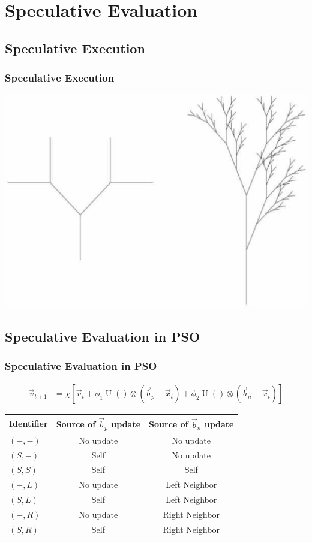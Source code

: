 \documentclass{beamer}
\DeclareMathOperator{\URand}{U}
\providecommand{\ppos}{\ensuremath{\Vec{x}}}
\providecommand{\pvel}{\ensuremath{\Vec{v}}}
\providecommand{\nbest}{\ensuremath{\Vec{b}_n}}
\providecommand{\pbest}{\ensuremath{\Vec{b}_p}}
\providecommand{\constriction}{\ensuremath{\chi}}
\providecommand{\coeff}{\ensuremath{\phi}}
\providecommand{\leftind}{\ensuremath{L}}
\providecommand{\rightind}{\ensuremath{R}}
\providecommand{\casexn}{\ensuremath{(S,-)}}
\providecommand{\casexx}{\ensuremath{(S,S)}}
\providecommand{\casexl}{\ensuremath{(S,\leftind)}}
\providecommand{\casexr}{\ensuremath{(S,\rightind)}}
\providecommand{\casepn}{\ensuremath{(-,-)}}
\providecommand{\casepl}{\ensuremath{(-,\leftind)}}
\providecommand{\casepr}{\ensuremath{(-,\rightind)}}
\begin{document}
\section{Speculative Evaluation}

\subsection{Speculative Execution}
\begin{frame}
  \frametitle{Speculative Execution}
  \includegraphics[width=\textwidth]{branching}
\end{frame}

\subsection{Speculative Evaluation in PSO}
\begin{frame}
  \frametitle{Speculative Evaluation in PSO}
  \begin{align*}
	  \pvel_{t+1} &=
		  \constriction \left[ \pvel_t +
			  \coeff_1\URand()\otimes(\pbest - \ppos_t) +
			  \coeff_2\URand()\otimes(\nbest - \ppos_t)
		  \right]
  \end{align*}
  \pause
  \begin{center}
	\begin{tabular}{lcc}
	  Identifier&Source of $\pbest$ update&Source of $\nbest$ update\\
	  \hline
	  \hline
	  $\casepn$&No update&No update\\
	  \hline
	  $\casexn$&Self&No update\\
	  \hline
	  $\casexx$&Self&Self\\
	  \hline
	  $\casepl$&No update&Left Neighbor\\
	  \hline
	  $\casexl$&Self&Left Neighbor\\
	  \hline
	  $\casepr$&No update&Right Neighbor\\
	  \hline
	  $\casexr$&Self&Right Neighbor\\
	  \hline
	\end{tabular}
  \end{center}
\end{frame}
\end{document}
